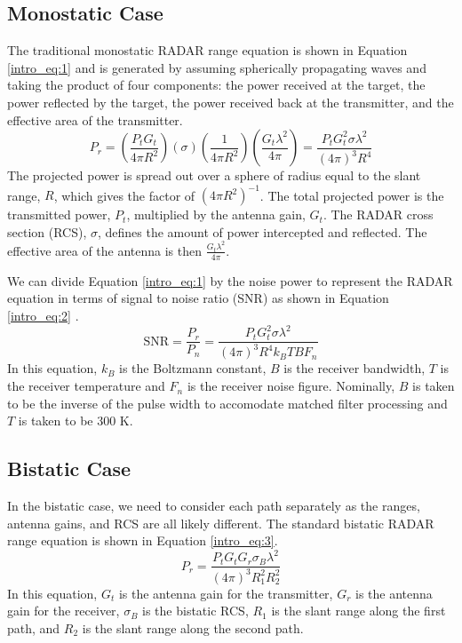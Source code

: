 \subsection{Monostatic Case}
The traditional monostatic RADAR range equation is shown in Equation \ref{intro_eq:1} and is generated by assuming spherically propagating waves and taking the product of four components: the power received at the target, the power reflected by the target, the power received back at the transmitter, and the effective area of the transmitter\cite{skolnik_handbook}.
  \begin{equation}
  \label{intro_eq:1}
 P_r = \left(\frac{P_tG_t}{4\pi R^2}\right) \left(\sigma \right)\left(\frac{1}{4\pi R^2}\right)\left( \frac{G_t\lambda^2}{4\pi} \right) = \frac{P_tG_t^2\sigma\lambda^2}{\left(4\pi\right)^3R^4}
  \end{equation}
The projected power is spread out over a sphere of radius equal to the slant range, $R$, which gives the factor of $\left( 4\pi R^2 \right)^{-1}$. The total projected power is the transmitted power, $P_t$, multiplied by the antenna gain, $G_t$. The RADAR cross section (RCS), $\sigma$, defines the amount of power intercepted and reflected. The effective area of the antenna is then $\frac{G_t\lambda^2}{4\pi}$.
  
We can divide Equation \ref{intro_eq:1} by the noise power to represent the RADAR equation in terms of signal to noise ratio (SNR) as shown in Equation \ref{intro_eq:2} \cite{skolnik_handbook}.
\begin{equation}
    \label{intro_eq:2}
\text{SNR} = \frac{P_r}{P_n} = \frac{P_tG_t^2\sigma\lambda^2}{\left(4\pi\right)^3 R^4k_BTBF_n}
\end{equation}
In this equation, $k_B$ is the Boltzmann constant, $B$ is the receiver bandwidth, $T$ is the receiver temperature and $F_n$ is the receiver noise figure. Nominally, $B$ is taken to be the inverse of the pulse width to accomodate matched filter processing and $T$ is taken to be $300$ K.

\subsection{Bistatic Case}
In the bistatic case, we need to consider each path separately as the ranges, antenna gains, and RCS are all likely different. The standard bistatic RADAR range equation is shown in Equation \ref{intro_eq:3}.
  \begin{equation}
  \label{intro_eq:3}
 P_r = \frac{P_tG_tG_r\sigma_B\lambda^2}{\left(4\pi\right)^3R_1^2R_2^2}
  \end{equation}
In this equation, $G_t$ is the antenna gain for the transmitter, $G_r$ is the antenna gain for the receiver, $\sigma_B$ is the bistatic RCS, $R_1$ is the slant range along the first path, and $R_2$ is the slant range along the second path.

